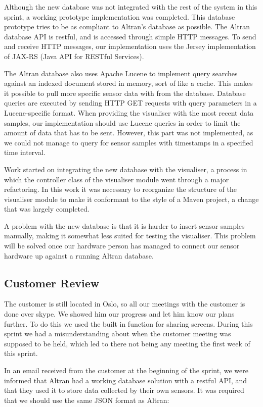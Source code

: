 \documentclass[../document]{subfiles}
\begin{document}
Although the new database was not integrated with the rest of the system in this sprint, a working prototype implementation was completed. This database prototype tries to be as compliant to Altran’s database as possible. The Altran database API is restful, and is accessed through simple HTTP messages. To send and receive HTTP messages, our implementation uses the Jersey implementation of JAX-RS (Java API for RESTful Services).

The Altran database also uses Apache Lucene to implement query searches against an indexed document stored in memory, sort of like a cache. This makes it possible to pull more specific sensor data with from the database. Database queries are executed by sending HTTP GET requests with query parameters in a Lucene-specific format. When providing the visualiser with the most recent data samples, our implementation should use Lucene queries in order to limit the amount of data that has to be sent. However, this part was not implemented, as we could not manage to query for sensor samples with timestamps in a specified time interval.

Work started on integrating the new database with the visualiser, a process in which the controller class of the visualiser module went through a major refactoring. In this work it was necessary to reorganize the structure of the visualiser module to make it conformant to the style of a Maven project, a change that was largely completed.

A problem with the new database is that it is harder to insert sensor samples manually, making it somewhat less suited for testing the visualiser. This problem will be solved once our hardware person has managed to connect our sensor hardware up against a running Altran database.

\subsection{Customer Review}
The customer is still located in Oslo, so all our meetings with the customer is done over skype. We showed him our progress and let him know our plans further. To do this we used the built in function for sharing screens. During this sprint we had a misunderstanding about when the customer meeting was supposed to be held, which led to there not being any meeting the first week of this sprint.

In an email received from the customer at the beginning of the sprint, we were informed that Altran had a working database solution with a restful API, and that they used it to store data collected by their own sensors. It was required that we should use the same JSON format as Altran:
\end{document}
